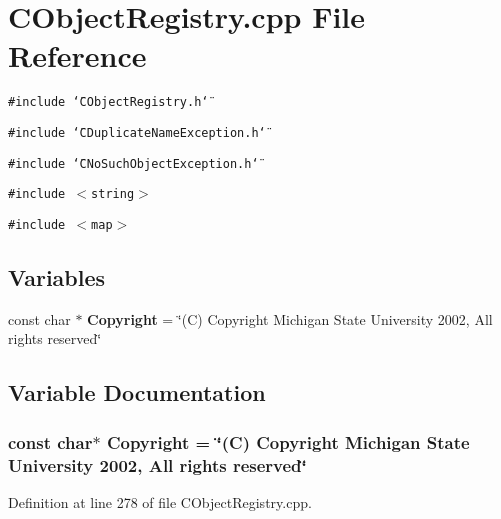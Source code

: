 \section{CObject\-Registry.cpp File Reference}
\label{CObjectRegistry_8cpp}
{\tt \#include \char`\"{}CObject\-Registry.h\char`\"{}}\par
{\tt \#include \char`\"{}CDuplicate\-Name\-Exception.h\char`\"{}}\par
{\tt \#include \char`\"{}CNo\-Such\-Object\-Exception.h\char`\"{}}\par
{\tt \#include $<$string$>$}\par
{\tt \#include $<$map$>$}\par
\subsection*{Variables}
\begin{CompactItemize}
\item 
const char $\ast$ {\bf Copyright} = \char`\"{}(C) Copyright Michigan State University 2002, All rights reserved\char`\"{}
\end{CompactItemize}


\subsection{Variable Documentation}
\subsubsection{\setlength{\rightskip}{0pt plus 5cm}const char$\ast$ Copyright = \char`\"{}(C) Copyright Michigan State University 2002, All rights reserved\char`\"{}\hspace{0.3cm}{\tt  [static]}}\label{CObjectRegistry_8cpp_a0}




Definition at line 278 of file CObject\-Registry.cpp.